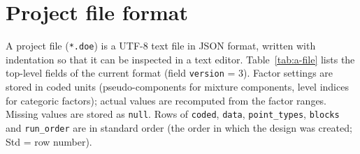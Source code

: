 \section{Project file format}
\label{sec:a-file}

A project file (\texttt{*.doe}) is a UTF-8 text file in JSON format, written with indentation so that it can be
inspected in a text editor. Table~\ref{tab:a-file} lists the top-level fields of the current format (field
\texttt{version} = 3). Factor settings are stored in coded units (pseudo-components for mixture components, level
indices for categoric factors); actual values are recomputed from the factor ranges. Missing values are stored as
\texttt{null}. Rows of \texttt{coded}, \texttt{data}, \texttt{point\_types}, \texttt{blocks} and
\texttt{run\_order} are in standard order (the order in which the design was created; Std = row number).

